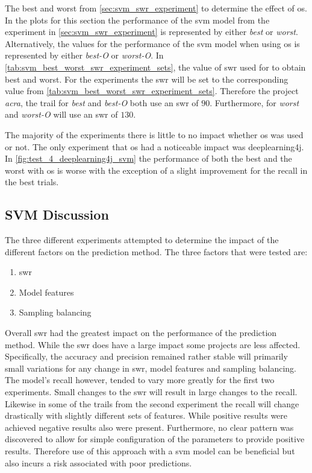The best and worst from \autoref{sec:svm_swr_experiment} to determine the effect of \gls{os}. In the plots for this section the performance of the \gls{svm} model from the experiment in \autoref{sec:svm_swr_experiment} is represented by either \textit{best} or \textit{worst}. Alternatively, the values for the performance of the \gls{svm} model when using \gls{os} is represented by either \textit{best-O} or \textit{worst-O}. In \autoref{tab:svm_best_worst_swr_experiment_sets}, the value of \gls{swr} used for to obtain best and worst. For the experiments the \gls{swr} will be set to the corresponding value from \autoref{tab:svm_best_worst_swr_experiment_sets}. Therefore the project \textit{acra}, the trail for \textit{best} and \textit{best-O} both use an \gls{swr} of $90$. Furthermore, for \textit{worst} and \textit{worst-O} will use an \gls{swr} of $130$.

The majority of the experiments there is little to no impact whether \gls{os} was used or not. The only experiment that \gls{os} had a noticeable impact was deeplearning4j. In \autoref{fig:test_4_deeplearning4j_svm} the performance of both the best and the worst with \gls{os} is worse with the exception of a slight improvement for the recall in the best trials.

\subsection{SVM Discussion}
\label{subsec:svm_discussion}

The three different experiments attempted to determine the impact of the different factors on the prediction method. The three factors that were tested are:
\begin{enumerate}
\item \gls{swr}
\item Model features
\item Sampling balancing
\end{enumerate}
Overall \gls{swr} had the greatest impact on the performance of the prediction method. While the \gls{swr} does have a large impact some projects are less affected. Specifically, the accuracy and precision remained rather stable will primarily small variations for any change in \gls{swr}, model features and sampling balancing. The model's recall however, tended to vary more greatly for the first two experiments. Small changes to the \gls{swr} will result in large changes to the recall. Likewise in some of the trails from the second experiment the recall will change drastically with slightly different sets of features. While positive results were achieved negative results also were present. Furthermore, no clear pattern was discovered to allow for simple configuration of the parameters to provide positive results. Therefore use of this approach with a \gls{svm} model can be beneficial but also incurs a risk associated with poor predictions.   

